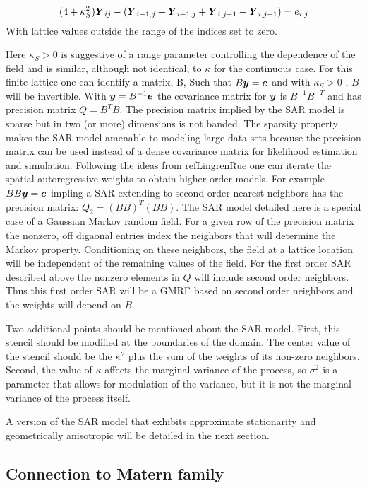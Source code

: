 \documentclass[review]{elsarticle}
\begin{document}
\[ (4+\kappa_{S}^2) \mbox{\boldmath $Y$}_{ij} - ( \mbox{\boldmath $Y$}_{i-1,j} + \mbox{\boldmath $Y$}_{i+1,j} + \mbox{\boldmath $Y$}_{i,j-1} + \mbox{\boldmath $Y$}_{i,j+1} ) =  e_{i,j} \]
With lattice values outside the range of the indices set to zero. 

Here $\kappa_{S}> 0 $ is suggestive of a range parameter controlling the dependence of the field and is similar, although not identical, to $\kappa$ for 
the continuous case.   For this finite lattice one can identify a matrix, B,  Such that $B\mbox{\boldmath $y$} =  \mbox{\boldmath $e$}$  and with $\kappa_{S}> 0$ , $B$ will be invertible. 
 With $\mbox{\boldmath $y$}  =   B^{-1} \mbox{\boldmath $e$}$  the covariance matrix for $\mbox{\boldmath $y$}$ is $ B^{-1}B^{-T}$ and has precision matrix $Q= B^T B $.  The precision matrix implied by the SAR model is sparse but in two (or more) dimensions is not banded. The sparsity property makes the SAR model amenable to modeling large data sets because the precision matrix can be used instead of a dense covariance matrix for likelihood estimation and simulation.  Following the ideas from ref{LingrenRue} one can iterate the spatial autoregressive weights to obtain higher order models. For example $ B B \mbox{\boldmath $y$} = \mbox{\boldmath $e$} $  impling a SAR extending to second order nearest neighbors has the precision matrix:  $Q_2= (B B)^T (B B)$.   The SAR model detailed here is a special case of a Gaussian Markov random field. For a given row of the precision matrix the nonzero, off digaonal  entries index the neighbors that will determine the Markov property. Conditioning on these neighbors, the field at a lattice location will be independent of the remaining values of the field. For the first order SAR described above the nonzero elements in $Q$ will include second order neighbors. Thus this first order SAR will be a GMRF based on second order neighbors and the weights will depend on $B$. 

Two additional points  should be mentioned about the SAR model. First, this stencil should be modified at the boundaries of the domain. The center value of the stencil should be the $\kappa^2$ plus the sum of the weights of its non-zero neighbors. Second, the value of $\kappa$ affects the marginal variance of the process, so $\sigma^2$ is a parameter that allows for modulation of the variance, but it is not the marginal variance of the process itself. 

A version of the SAR model that exhibits  approximate stationarity and  geometrically anisotropic will be detailed in the next section. 
 


\subsection{Connection to Matern family}
\end{document}
